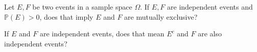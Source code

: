 \documentclass[../main.tex]{subfiles}
\begin{document}
\begin{example} 
  Let \(E,F\) be two events in a sample space \(\Omega\). If \(E,F\) are independent events and \(\mathbb{P}(E) > 0\), does that imply \(E\) and \(F\) are mutually exclusive?

\end{example}

\begin{example}
  If \(E\) and \(F\) are independent events, does that mean \(E^{c}\) and \(F\) are also independent events?

\end{example}
\end{document}
